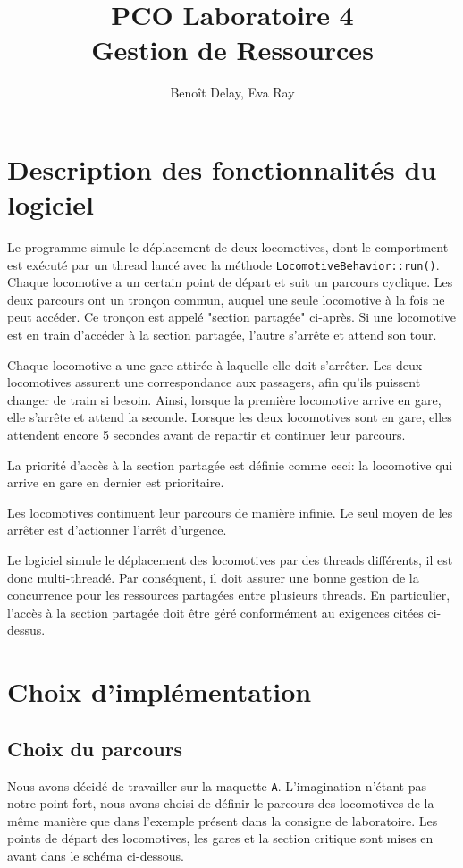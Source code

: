 \documentclass{article}
\title{PCO Laboratoire 4 \\
\large Gestion de Ressources}
\author{Benoît Delay, Eva Ray}
\begin{document}
\maketitle

\section*{Description des fonctionnalités du logiciel}

Le programme simule le déplacement de deux locomotives, dont le comportment est exécuté par un thread lancé avec la méthode \texttt{LocomotiveBehavior::run()}. 
Chaque locomotive a un certain point de départ et suit un parcours cyclique. Les deux
parcours ont un tronçon commun, auquel une seule locomotive à la fois ne peut accéder. Ce tronçon est appelé "section partagée" ci-après. Si une
locomotive est en train d'accéder à la section partagée, l'autre s'arrête et attend son tour. 

Chaque locomotive a une gare attirée à laquelle elle doit s'arrêter. Les deux locomotives assurent une correspondance aux passagers, 
afin qu'ils puissent changer de train si besoin. Ainsi, lorsque la première locomotive arrive en gare, elle s'arrête et attend la seconde. 
Lorsque les deux locomotives sont en gare, elles attendent encore 5 secondes avant de repartir et continuer leur parcours. 

La priorité d'accès à la section partagée est définie comme ceci: la locomotive qui arrive en gare en dernier est prioritaire. 

Les locomotives continuent leur parcours de manière infinie. Le seul moyen de les arrêter est d'actionner l'arrêt d'urgence. 

Le logiciel simule le déplacement des locomotives par des threads différents, il est donc multi-threadé. Par conséquent, il doit 
assurer une bonne gestion de la concurrence pour les ressources partagées entre plusieurs threads. En particulier, l'accès à la section
partagée doit être géré conformément au exigences citées ci-dessus. 

\section*{Choix d'implémentation}
\subsection*{Choix du parcours}
Nous avons décidé de travailler sur la maquette \texttt{A}. L'imagination n'étant pas notre point fort, nous avons choisi de définir le parcours des
locomotives de la même manière que dans l'exemple présent dans la consigne de laboratoire. Les points de départ des locomotives, les gares et la
section critique sont mises en avant dans le schéma ci-dessous. 
\end{document}
